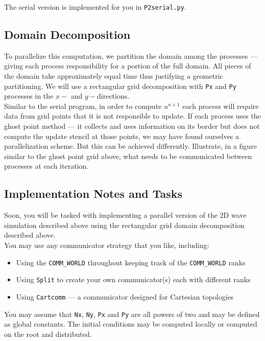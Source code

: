 \documentclass[12pt]{article}
\begin{document}
The serial version is implemented for you in \texttt{P2serial.py}.

\subsection*{Domain Decomposition}

To parallelize this computation, we partition the domain among the processes --- giving each process responsibility for a portion of the full domain.  All pieces of the domain take approximately equal time thus justifying a geometric partitioning.  We will use a rectangular grid decomposition with \texttt{Px} and \texttt{Py} processes in the $x-$ and $y-$directions. \\

Similar to the serial program, in order to compute $u^{n+1}$ each process will require data from grid points that it is not responsible to update.  If each process uses the ghost point method --- it collects and uses information on its border but does not compute the update stencil at those points, we may have found ourselves a parallelization scheme.  But this can be achieved differently.  Illustrate, in a figure similar to the ghost point grid above, what needs to be communicated between processes at each iteration.

\subsection*{Implementation Notes and Tasks}

Soon, you will be tasked with implementing a parallel version of the 2D wave simulation described above using the rectangular grid domain decomposition described above. \\

You may use any communicator strategy that you like, including:
\begin{itemize}
\item Using the \texttt{COMM\_WORLD} throughout keeping track of the \texttt{COMM\_WORLD} ranks
\item Using \texttt{Split} to create your own communicator(s) each with different ranks
\item Using \texttt{Cartcomm} --- a communicator designed for Cartesian topologies
\end{itemize}

You may assume that \texttt{Nx}, \texttt{Ny}, \texttt{Px} and \texttt{Py} are all powers of two and may be defined as global constants.  The initial conditions may be computed locally or computed on the root and distributed. \\
\end{document}
